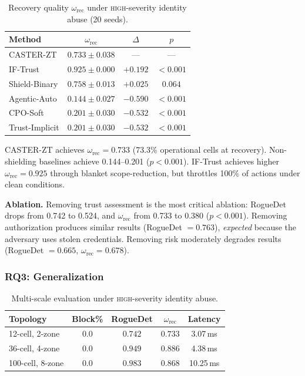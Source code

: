 \begin{table}[t]
\centering
\caption{Recovery quality $\omega_{\mathrm{rec}}$ under \textsc{high}-severity identity abuse (20 seeds).}
\label{art3:tab:recovery_quality}
\begin{tabular}{lccc}
\toprule
Method & $\omega_{\mathrm{rec}}$ & $\Delta$ & $p$ \\
\midrule
CASTER-ZT & $\mathbf{0.733\pm0.038}$ & --- & --- \\
IF-Trust & $0.925\pm0.000$ & $+0.192$ & ${<}0.001$ \\
Shield-Binary & $0.758\pm0.013$ & $+0.025$ & $0.064$ \\
Agentic-Auto & $0.144\pm0.027$ & $-0.590$ & ${<}0.001$ \\
CPO-Soft & $0.201\pm0.030$ & $-0.532$ & ${<}0.001$ \\
Trust-Implicit & $0.201\pm0.030$ & $-0.532$ & ${<}0.001$ \\
\bottomrule
\end{tabular}
\end{table}

CASTER-ZT achieves $\omega_{\mathrm{rec}}=0.733$ (73.3\% operational cells at recovery).
Non-shielding baselines achieve 0.144--0.201 ($p<0.001$).
IF-Trust achieves higher $\omega_{\mathrm{rec}}=0.925$ through blanket scope-reduction, but throttles 100\% of actions under clean conditions.

\noindent\textbf{Ablation.}
Removing trust assessment is the most critical ablation: RogueDet drops from 0.742 to 0.524, and $\omega_{\mathrm{rec}}$ from 0.733 to 0.380 ($p<0.001$).
Removing authorization produces similar results (RogueDet $=0.763$), \emph{expected} because the adversary uses stolen credentials.
Removing risk moderately degrades results (RogueDet $=0.665$, $\omega_{\mathrm{rec}}=0.678$).


\subsubsection{RQ3: Generalization}

\begin{table}[t]
\centering
\caption{Multi-scale evaluation under \textsc{high}-severity identity abuse.}
\label{art3:tab:multiscale}
\begin{tabular}{lcccc}
\toprule
Topology & Block\% & RogueDet & $\omega_{\mathrm{rec}}$ & Latency \\
\midrule
12-cell, 2-zone & $0.0$ & $0.742$ & $0.733$ & 3.07\,ms \\
36-cell, 4-zone & $0.0$ & $0.949$ & $0.886$ & 4.38\,ms \\
100-cell, 8-zone & $0.0$ & $0.983$ & $0.868$ & 10.25\,ms \\
\bottomrule
\end{tabular}
\end{table}

